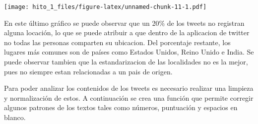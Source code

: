 \documentclass[
]{article}
\newenvironment{Shaded}{\begin{snugshade}}{\end{snugshade}}
\newcommand{\DataTypeTok}[1]{\textcolor[rgb]{0.13,0.29,0.53}{#1}}
\newcommand{\DecValTok}[1]{\textcolor[rgb]{0.00,0.00,0.81}{#1}}
\newcommand{\KeywordTok}[1]{\textcolor[rgb]{0.13,0.29,0.53}{\textbf{#1}}}
\newcommand{\NormalTok}[1]{#1}
\newcommand{\OperatorTok}[1]{\textcolor[rgb]{0.81,0.36,0.00}{\textbf{#1}}}
\newcommand{\StringTok}[1]{\textcolor[rgb]{0.31,0.60,0.02}{#1}}
\begin{document}
\begin{Shaded}
\end{Shaded}

\texttt{[image: hito\_1\_files/figure-latex/unnamed-chunk-11-1.pdf]}

En este último gráfico se puede observar que un 20\% de los tweets no
registran alguna locación, lo que se puede atribuir a que dentro de la
aplicacion de twitter no todas las personas comparten su ubicacion. Del
porcentaje restante, los lugares más comunes son de países como Estados
Unidos, Reino Unido e India. Se puede observar tambien que la
estandarizacion de las localidades no es la mejor, pues no siempre estan
relacionadas a un pais de origen.

Para poder analizar los contenidos de los tweets es necesario realizar
una limpieza y normalización de estos. A continuación se crea una
función que permite corregir algunos patrones de los textos tales como
números, puntuación y espacios en blanco.
\end{document}

